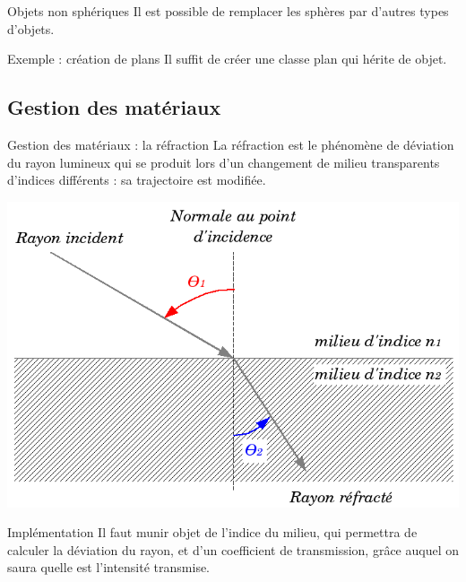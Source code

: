 \documentclass{beamer}
\begin{document}
\begin{frame}{Objets non sphériques}
Il est possible de remplacer les sphères par d'autres types d'objets.

\begin{block}{Exemple : création de plans}
Il suffit de créer une classe plan qui hérite de objet.
\end{block}
\end{frame}

\subsection{Gestion des matériaux}
\begin{frame}{Gestion des matériaux : la réfraction}
La réfraction est le phénomène de déviation du rayon lumineux qui se produit
lors d'un changement de milieu transparents d'indices différents : sa
trajectoire est modifiée.

\begin{center}
  \includegraphics[scale=0.2]{img/Refraction_fr.png}
\end{center}

\begin{block}{Implémentation}
Il faut munir objet de l'indice du milieu, qui permettra de calculer la
déviation du rayon, et d'un coefficient de transmission, grâce auquel on saura
quelle est l'intensité transmise.
\end{block}
\end{frame}
\end{document}
